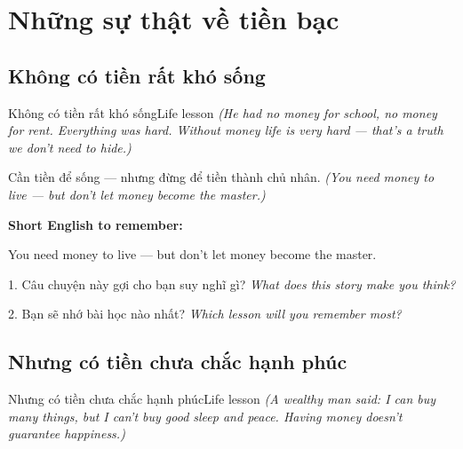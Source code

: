 \chapter{Những sự thật về tiền bạc}


\section{Không có tiền rất khó sống}
\begin{truyen}{Không có tiền rất khó sống}{Life lesson}
\textit{(He had no money for school, no money for rent. Everything was hard. Without money life is very hard — that's a truth we don't need to hide.)}
\end{truyen}

\begin{baihoc}
Cần tiền để sống — nhưng đừng để tiền thành chủ nhân.
\textit{(You need money to live — but don't let money become the master.)}
\end{baihoc}

\begin{ghinhoanh}
\textbf{Short English to remember:}

You need money to live — but don't let money become the master.

\end{ghinhoanh}

\begin{tuhocnhanh}
1. Câu chuyện này gợi cho bạn suy nghĩ gì? \textit{What does this story make you think?}

2. Bạn sẽ nhớ bài học nào nhất? \textit{Which lesson will you remember most?}
\end{tuhocnhanh}
\ngancach


\section{Nhưng có tiền chưa chắc hạnh phúc}
\begin{truyen}{Nhưng có tiền chưa chắc hạnh phúc}{Life lesson}
\textit{(A wealthy man said: I can buy many things, but I can't buy good sleep and peace. Having money doesn't guarantee happiness.)}
\end{truyen}

